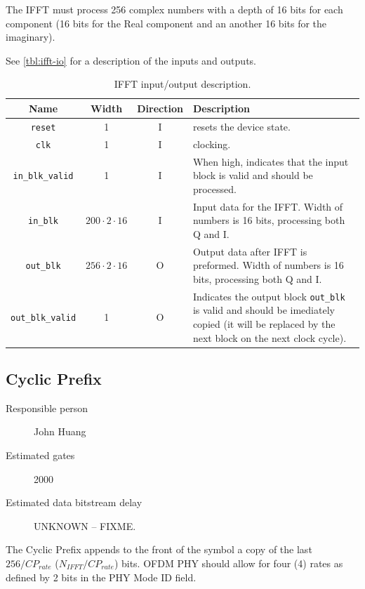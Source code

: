 \documentclass[dvips,10pt,twocolumn]{article}
\newcommand{\wire}{\texttt}
\begin{document}
The IFFT must process 256 complex numbers with a depth of 16 bits for each
component (16 bits for the Real component and an another 16 bits for the
imaginary).

See \autoref{tbl:ifft-io} for a description of the inputs and outputs.

\begin{table} \begin{tabularx}{\linewidth}{c|c|c|X}
	\label{tbl:ifft-io}
	
	Name & Width & Direction & Description \\ \hline

	\wire{reset} & 1 & I & resets the device state. \\

	\wire{clk}   & 1 & I & clocking. \\

	\wire{in\_blk\_valid} & 1 & I & When high, indicates that the input block is
	valid and should be processed. \\

	\wire{in\_blk} & $200 \cdot 2 \cdot 16$ & I & Input data for the IFFT. Width of
	numbers is 16 bits, processing both Q and I. \\

	\wire{out\_blk} & $256 \cdot 2 \cdot 16$ & O & Output data after IFFT is preformed. Width of
	numbers is 16 bits, processing both Q and I. \\

	\wire{out\_blk\_valid} & 1 & O & Indicates the output block
	\wire{out\_blk} is valid and should be imediately copied (it will be
	replaced by the next block on the next clock cycle).

\end{tabularx}
\caption{IFFT input/output description.}
\end{table}


\subsection{Cyclic Prefix}
\label{sec:cyclic_prefix}
\begin{description}
	\item[Responsible person] John Huang
	\item[Estimated gates] 2000
	\item[Estimated data bitstream delay] UNKNOWN -- FIXME.
\end{description}
	
The Cyclic Prefix appends to the front of the symbol a copy of the last
$256/CP_{rate}$ ($N_{IFFT}/CP_{rate}$) bits. OFDM PHY should allow for four
(4) rates as defined by 2 bits in the PHY Mode ID field. 
\end{document}
